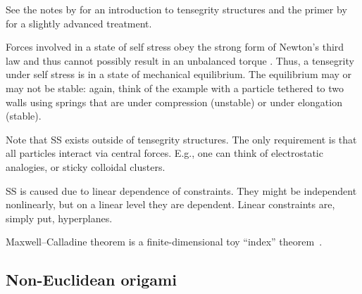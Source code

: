 See the notes by \citet{connelly2015} for an introduction to tensegrity structures and the primer by \citet{williams2003} for a slightly advanced treatment.

Forces involved in a state of self stress obey the strong form of Newton's third law and thus cannot possibly result in an unbalanced torque \cite[\S 1.2]{goldstein2002}.
Thus, a tensegrity under self stress is in a state of mechanical equilibrium.
The equilibrium may or may not be stable: again, think of the example with a particle tethered to two walls using springs that are under compression (unstable) or under elongation (stable).

Note that SS exists outside of tensegrity structures.
The only requirement is that all particles interact via central forces.
E.g., one can think of electrostatic analogies, or sticky colloidal clusters.

SS is caused due to linear dependence of constraints.
They might be independent nonlinearly, but on a linear level they are dependent.
Linear constraints are, simply put, hyperplanes.

Maxwell--Calladine theorem is a finite-dimensional toy ``index'' theorem~\cite[\S 2.2]{nakahara2003}.

\subsection{Non-Euclidean origami}

